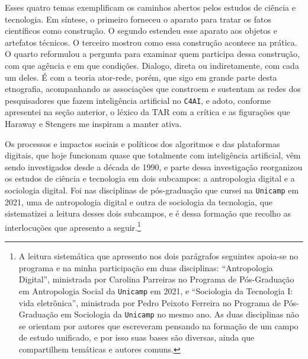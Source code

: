 Esses quatro temas exemplificam os caminhos abertos pelos estudos de ciência e tecnologia. Em síntese, o primeiro forneceu o aparato para tratar os fatos científicos como construção. O segundo estendeu esse aparato aos objetos e artefatos técnicos. O terceiro mostrou como essa construção acontece na prática. O quarto reformulou a pergunta para examinar quem participa dessa construção, com que agência e em que condições. Dialogo, direta ou indiretamente, com cada um deles. É com a teoria ator-rede, porém, que sigo em grande parte desta etnografia, acompanhando as associações que constroem e sustentam as redes dos pesquisadores que fazem inteligência artificial no \texttt{C4AI}, e adoto, conforme apresentei na seção anterior, o léxico da TAR com a crítica e as figurações que Haraway e Stengers me inspiram a manter ativa.

Os processos e impactos sociais e políticos dos algoritmos e das plataformas digitais, que hoje funcionam quase que totalmente com inteligência artificial, vêm sendo investigados desde a década de 1990, e parte dessa investigação reorganizou os estudos de ciência e tecnologia em dois subcampos: a antropologia digital e a sociologia digital. Foi nas disciplinas de pós-graduação que cursei na \texttt{Unicamp} em 2021, uma de antropologia digital e outra de sociologia da tecnologia, que sistematizei a leitura desses dois subcampos, e é dessa formação que recolho as interlocuções que apresento a seguir.\footnote{A leitura sistemática que apresento nos dois parágrafos seguintes apoia-se no programa e na minha participação em duas disciplinas: \enquote{Antropologia Digital}, ministrada por Carolina Parreiras no Programa de Pós-Graduação em Antropologia Social da \texttt{Unicamp} em 2021, e \enquote{Sociologia da Tecnologia I: vida eletrônica}, ministrada por Pedro Peixoto Ferreira no Programa de Pós-Graduação em Sociologia da \texttt{Unicamp} no mesmo ano. As duas disciplinas não se orientam por autores que escreveram pensando na formação de um campo de estudo unificado, e por isso suas bases são diversas, ainda que compartilhem temáticas e autores comuns.}

